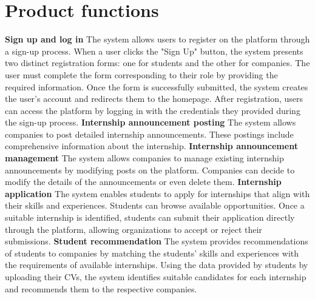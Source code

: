 \section{Product functions }
\textbf{Sign up and log in}\newline
The system allows users to register on the platform through a sign-up process. When a user clicks the "Sign Up" button, the system presents two distinct registration forms: one for students and the other for companies. The user must complete the form corresponding to their role by providing the required information. Once the form is successfully submitted, the system creates the user's account and redirects them to the homepage. After registration, users can access the platform by logging in with the credentials they provided during the sign-up process.
\newline
\newline
\textbf{Internship announcement posting}\newline
The system allows companies to post detailed internship announcements. These postings include comprehensive information about the internship.
\newline
\newline
\textbf{Internship announcement management}\newline
The system allows companies to manage existing internship announcements by modifying posts on the platform. Companies can decide to modify the details of the announcements or even delete them.
\newline
\newline
\textbf{Internship application}\newline
The system enables students to apply for internships that align with their skills and experiences. Students can browse available opportunities. Once a suitable internship is identified, students can submit their application directly through the platform, allowing organizations to accept or reject their submissions.
\newline
\newline
\textbf{Student recommendation}\newline
The system provides recommendations of students to companies by matching the students' skills and experiences with the requirements of available internships. Using the data provided by students by uploading their CVs, the system identifies suitable candidates for each internship and recommends them to the respective companies. 
\newline
\newline
